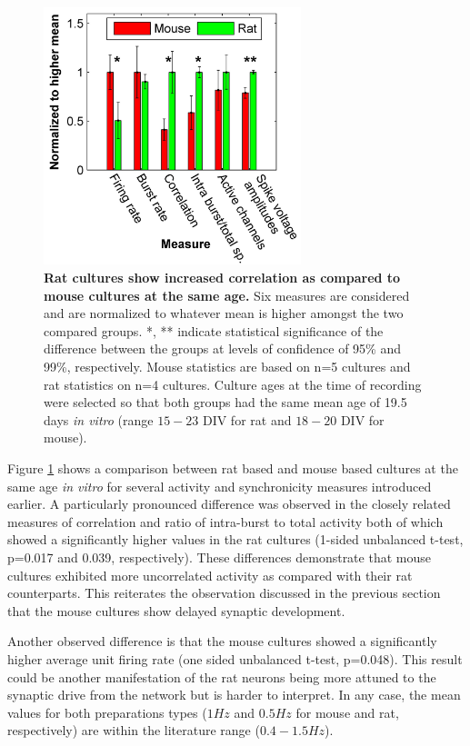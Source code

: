        \begin{figure}[!htb]
            \centering
            \includegraphics[width=7.5cm]{chapter3/figures/mouseRatComp/ratMouseComp.jpg}

            \caption[Comparison between spontaneous activity in mouse and rat based cultures]{\textbf{Rat cultures show increased correlation as compared to mouse cultures at the same age.} Six measures are considered and are normalized to whatever mean is higher amongst the two compared groups. *, ** indicate statistical significance of the difference between the groups at levels of confidence of 95\% and 99\%, respectively. Mouse statistics are based on n=5 cultures and rat statistics on n=4 cultures. Culture ages at the time of recording were selected so that both groups had the same mean age of 19.5 days \textit{in vitro} (range \(15-23\) DIV for rat and \(18-20\) DIV for mouse).}
            \label{fig:activity:mouseRatComparison}
       \end{figure}

    Figure \ref{fig:activity:mouseRatComparison} shows a comparison between rat based and mouse based cultures at the same age \textit{in vitro} for several activity and synchronicity measures introduced earlier. A particularly pronounced difference was observed in the closely related measures of correlation and ratio of intra-burst to total activity both of which showed a significantly higher values in the rat cultures (1-sided unbalanced t-test, p=0.017 and 0.039, respectively). These differences demonstrate that mouse cultures exhibited more uncorrelated activity as compared with their rat counterparts. This reiterates the observation discussed in the previous section that the mouse cultures show delayed synaptic development.

    Another observed difference is that the mouse cultures showed a significantly higher average unit firing rate (one sided unbalanced t-test, p=0.048). This result could be another manifestation of the rat neurons being more attuned to the synaptic drive from the network but is harder to interpret. In any case, the mean values for both preparations types (\(1 Hz\) and \(0.5 Hz\) for mouse and rat, respectively) are within the literature range (\(0.4-1.5 Hz\)).


